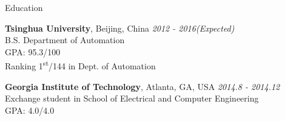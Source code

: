 \documentclass{resume} %
\begin{document}

\begin{rSection}{Education}

{\bf Tsinghua University}, Beijing, China \hfill {\em 2012 - 2016(Expected)} \\ 
B.S. Department of Automation \\
GPA: 95.3/100\\
Ranking 1\textsuperscript{st}/144 in Dept. of Automation

{\bf Georgia Institute of Technology}, Atlanta, GA, USA \hfill {\em 2014.8 - 2014.12} \\ 
Exchange student in School of Electrical and Computer Engineering\\
GPA: 4.0/4.0


\end{rSection}

\end{document}
